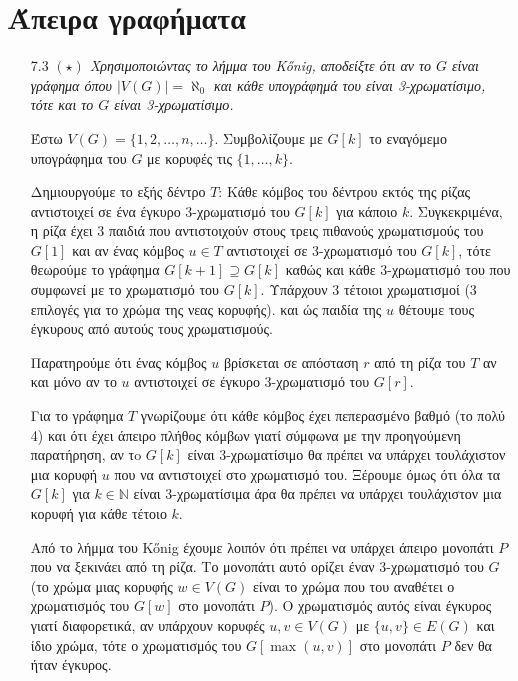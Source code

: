 \documentclass[a4paper, oneside, 11pt]{article}
\theoremstyle{definition}
\begin{document}
\section{Άπειρα γραφήματα}

\begin{enumerate}
   \item[7.3] \emph{$(\star)$ Χρησιμοποιώντας το λήμμα του K\H{o}nig, αποδείξτε
   ότι αν το $G$ είναι γράφημα όπου $|V(G)| = \aleph_0$ και κάθε υπογράφημά
   του είναι 3-χρωματίσιμο, τότε και το $G$ είναι 3-χρωματίσιμο.}

   Έστω $V(G) = \{ 1, 2, \ldots, n, \ldots \}$. Συμβολίζουμε με $G[k]$
   το εναγόμεμο υπογράφημα του $G$ με κορυφές τις $\{1, \ldots, k\}$.

   Δημιουργούμε το εξής δέντρο $T$: Κάθε κόμβος του δέντρου εκτός της ρίζας
   αντιστοιχεί σε ένα έγκυρο 3-χρωματισμό του $G[k]$ για κάποιο $k$.
   Συγκεκριμένα, η ρίζα έχει 3 παιδιά που αντιστοιχούν στους τρεις πιθανούς
   χρωματισμούς του $G[1]$ και αν ένας κόμβος $u \in T$ αντιστοιχεί σε
   3-χρωματισμό
   του $G[k]$, τότε θεωρούμε το γράφημα $G[k+1] \supseteq G[k]$ καθώς και κάθε
   3-χρωματισμό του που συμφωνεί με το χρωματισμό του $G[k]$. Υπάρχουν
   3 τέτοιοι χρωματισμοί (3 επιλογές για το χρώμα της νεας κορυφής).
   και ώς παιδία της $u$ θέτουμε τους έγκυρους από αυτούς
   τους χρωματισμούς.

   Παρατηρούμε ότι ένας κόμβος $u$ βρίσκεται σε απόσταση $r$ από τη ρίζα
   του $T$ αν και μόνο αν το $u$ αντιστοιχεί σε έγκυρο 3-χρωματισμό
   του $G[r]$.

   Για το γράφημα $T$ γνωρίζουμε ότι κάθε κόμβος έχει πεπερασμένο βαθμό
   (το πολύ 4) και ότι έχει άπειρο πλήθος κόμβων γιατί σύμφωνα με την
   προηγούμενη παρατήρηση, αν τo $G[k]$ είναι 3-χρωματίσιμο θα πρέπει
   να υπάρχει τουλάχιστον μια κορυφή $u$ που να αντιστοιχεί στο
   χρωματισμό του. Ξέρουμε όμως ότι όλα τα $G[k]$ για $k \in \mathbb{N}$
   είναι 3-χρωματίσιμα άρα θα πρέπει να υπάρχει τουλάχιστον μια κορυφή
   για κάθε τέτοιο $k$.

   Από το λήμμα του K\H{o}nig έχουμε λοιπόν ότι πρέπει να υπάρχει άπειρο
   μονοπάτι $P$ που να ξεκινάει από τη ρίζα. Το μονοπάτι αυτό ορίζει
   έναν 3-χρωματισμό του $G$ (το χρώμα μιας κορυφής $w \in V(G)$
   είναι το χρώμα που του αναθέτει ο χρωματισμός του $G[w]$ στο μονοπάτι
   $P$). O χρωματισμός αυτός είναι έγκυρος γιατί διαφορετικά, αν υπάρχουν
   κορυφές $u, v \in V(G)$ με $\{u, v\} \in E(G)$ και ίδιο χρώμα, τότε
   ο χρωματισμός του $G[\max(u, v)]$ στο μονοπάτι $P$ δεν θα ήταν έγκυρος.
\end{enumerate}
\end{document}

